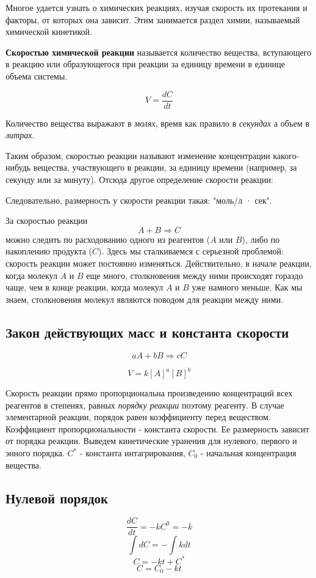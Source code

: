 \documentclass[14pt,a4paper]{scrartcl}
\begin{document}
Многое удается узнать о химических реакциях, изучая скорость их протекания и факторы, от которых она зависит. Этим занимается раздел химии, называемый химической кинетикой.

\textbf{Скоростью химической реакции} называется количество вещества, вступающего в реакцию или образующегося при реакции за единицу времени в единице объема системы.

$$V = \frac {dC}{dt}$$

Количество вещества выражают в \emph{молях}, время как правило в \emph{секундах} а объем в \emph{литрах}.

Таким образом, скоростью реакции называют изменение концентрации какого-нибудь вещества, участвующего в реакции, за единицу времени (например, за секунду или за минуту). Отсюда другое определение скорости реакции:

Следовательно, размерность у скорости реакции такая: "моль/л · сек".

За скоростью реакции $$A + B \Rightarrow C$$ можно следить по расходованию одного из реагентов ($A$ или $B$), либо по накоплению продукта ($C$). Здесь мы сталкиваемся с серьезной проблемой: скорость реакции может постоянно изменяться. Действительно, в начале реакции, когда молекул $A$ и $B$ еще много, столкновения между ними происходят гораздо чаще, чем в конце реакции, когда молекул $A$ и $B$ уже намного меньше. Как мы знаем, столкновения молекул являются поводом для реакции между ними. 

\subsection*{Закон действующих масс и константа скорости} 

$$aA + bB \Rightarrow cC$$

$$V = k \left[A\right]^a\left[B\right]^b$$


Скорость реакции прямо пропорциональна произведению концентраций всех реагентов в степенях, равных \emph{порядку реакции} поэтому реагенту. В случае элементарной реакции, порядок равен коэффициенту перед веществом. Коэффициент пропорциональности - константа скорости. Ее размерность зависит от порядка реакции. Выведем кинетические уранения для нулевого, первого и энного порядка. $C^*$ - константа интагрирования, $C_0$ - начальная концентрация вещества. 

\subsection*{Нулевой порядок}
$$\frac{dC}{dt} = -kC^0 = -k$$
$$\int dC = -\int kdt$$
$$C = -kt + C^*$$
$$C = C_0 - kt$$
\end{document}
